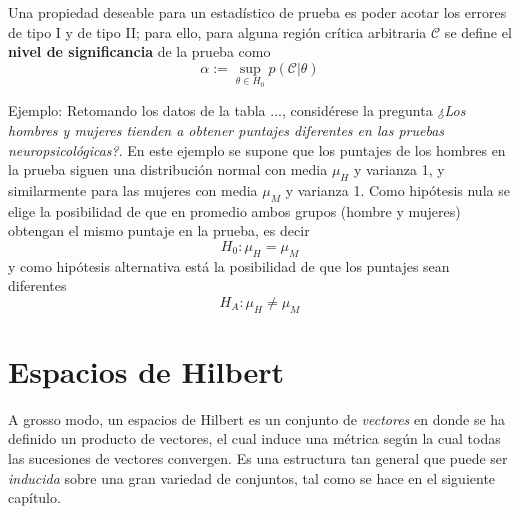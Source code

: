 
Una propiedad deseable para un estadístico de prueba es poder acotar los errores de tipo I y de tipo II; para ello, para alguna región crítica arbitraria $\mathcal{C}$ se define el \textbf{nivel de significancia} de la prueba como
\begin{equation}
\alpha := \sup_{\theta \in H_0} p(\mathcal{C} \lvert \theta)
\end{equation}

Ejemplo:
Retomando los datos de la tabla ..., considérese la pregunta \textit{¿Los hombres y mujeres tienden
a obtener puntajes diferentes en las pruebas neuropsicológicas?}. 
%
En este ejemplo se supone que los puntajes de los hombres en la prueba siguen una distribución normal con media $\mu_H$ y varianza 1, y similarmente para las mujeres con media $\mu_M$ y varianza 1.
%
Como hipótesis nula se elige la posibilidad de que en promedio ambos grupos (hombre y mujeres) obtengan el mismo puntaje en la prueba, es decir
\begin{equation}
H_0 : \mu_H = \mu_M
\end{equation}
y como hipótesis alternativa está la posibilidad de que los puntajes sean diferentes
\begin{equation}
H_A : \mu_H \neq \mu_M
\end{equation}

%


\section{Espacios de Hilbert}

A grosso modo, un espacios de Hilbert es un conjunto de \textit{vectores} en donde se ha definido un producto de vectores, el cual induce una métrica según la cual todas las sucesiones de vectores convergen.
%
Es una estructura tan general que puede ser \textit{inducida} sobre una gran variedad de conjuntos, tal como se hace en el siguiente capítulo.

